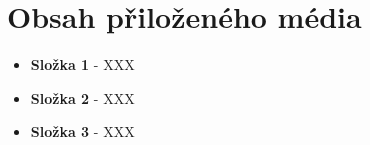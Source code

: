 \chapter{Obsah přiloženého média}

\begin{itemize}
    \item[] \textbf{Složka 1} - XXX
    \item[] \textbf{Složka 2} - XXX
    \item[] \textbf{Složka 3} - XXX
\end{itemize}